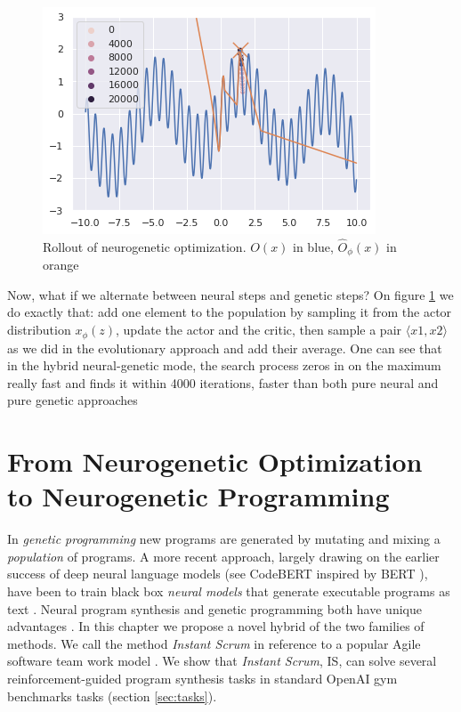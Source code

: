     
\begin{figure}
    \centering
    \includegraphics[width=0.8\linewidth]{images/neuropt4.png}
    \caption{Rollout of neurogenetic optimization. $ O(x) $ in blue, $ \hat{O}_{\phi}(x) $ in orange}
    \label{fig:neuropt-combined}
\end{figure}

Now, what if we alternate between neural steps and genetic steps?
On figure \ref{fig:neuropt-combined} we do exactly that: add one element to the population by sampling it from the actor distribution $ x_{\phi}(z) $, update the actor and the critic, then sample a pair $\langle x1,x2 \rangle$ as we did in the evolutionary approach and add their average.
One can see that in the hybrid neural-genetic mode, the search process zeros in on the maximum really fast and finds it within 4000 iterations, faster than both pure neural and pure genetic approaches 

\newpage
\section{From Neurogenetic Optimization to Neurogenetic Programming}

In \emph{genetic programming} \cite{genprog1,genprog2} new programs are generated by mutating and mixing a \emph{population} of programs. 
 A more recent approach, largely drawing on the earlier success of deep neural language models (see CodeBERT \cite{codebert} inspired by BERT \cite{devlinBERTPretrainingDeep2019}), have been to train black box \emph{neural models} that generate executable programs as text \cite{abolafiaNeuralProgramSynthesis2018,deepcoder,structural}. 
 Neural program synthesis and genetic programming both have unique advantages \cite{geneticvsneural}. 
 In this chapter we propose a novel hybrid of the two families of methods. We call the method \emph{Instant Scrum} in reference to a popular Agile software team work model \cite{scrum}. We show that \emph{Instant Scrum}, IS, can solve several reinforcement-guided program synthesis tasks in standard OpenAI gym benchmarks tasks (section \ref{sec:tasks}). 

